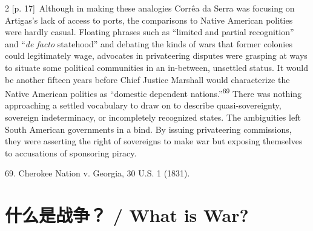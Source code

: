 \documentclass[10pt,a4paper]{article}
\begin{document}
\begin{paracol}{2}
{\scriptsize\color{gray} [p. 17]}\ Although in making these analogies Corrêa da Serra was focusing on Artigas’s lack of access to ports, the comparisons to Native American polities were hardly casual. Floating phrases such as “limited and partial recognition” and “\textit{de facto} statehood” and debating the kinds of wars that former colonies could legitimately wage, advocates in privateering disputes were grasping at ways to situate some political communities in an in-between, unsettled status. It would be another fifteen years before Chief Justice Marshall would characterize the Native American polities as “domestic dependent nations.”\nobreak\textsuperscript{69} There was nothing approaching a settled vocabulary to draw on to describe quasi-sovereignty, sovereign indeterminacy, or incompletely recognized states. The ambiguities left South American governments in a bind. By issuing privateering commissions, they were asserting the right of sovereigns to make war but exposing themselves to accusations of sponsoring piracy.\par{\small 69. Cherokee Nation v. Georgia, 30 U.S. 1 (1831).\par}
\switchcolumn*
\end{paracol}
\section*{什么是战争？ / What is War?}
\end{document}
